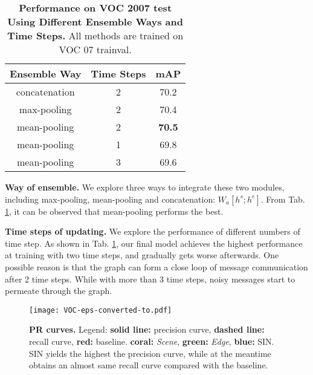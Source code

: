 \documentclass[10pt,twocolumn,letterpaper]{article}
\begin{document}
{\begin{table}
\caption{{\bf Performance on VOC 2007 test Using Different Ensemble Ways and Time Steps.} All methods are trained on VOC 07 trainval.}
\begin{center}
{
\begin{tabular}{c|c|c}
\hline
Ensemble Way & Time Steps & mAP \\
\hline
\hline
concatenation & 2 & 70.2 \\
max-pooling & 2 & 70.4 \\
\hline
mean-pooling & 2 & {\bf 70.5} \\
\hline
mean-pooling & 1  & 69.8 \\
mean-pooling & 3 & 69.6 \\
\hline
\end{tabular}}
\end{center}
\label{table:ensemble}
\vspace{-5ex}
\end{table}


{\bf Way of ensemble.}
We explore three ways to integrate these two modules, including max-pooling, mean-pooling and concatenation: $W_a[h^s; h^e]$. From Tab. \ref{table:ensemble}, it can be observed that mean-pooling performs the best.

{\bf Time steps of updating.}
We explore the performance of different numbers of time step. As shown in Tab. \ref{table:ensemble}, our final model achieves the highest performance at training with two time steps, and gradually gets worse afterwards. One possible reason is that
{the graph can form a close loop of message communication after 2 time steps. While with more than 3 time steps, noisy messages start to permeate through the graph.}


\begin{figure}[t]
\vspace{-0.5ex}
\centering
 \texttt{[image: VOC-eps-converted-to.pdf]}
    \caption{{\bf PR curves.} Legend: {\bf solid line:} precision curve, {\bf dashed line:} recall curve, {\bf red:} baseline. {\bf coral:} {\em Scene}, {\bf green:} {\em Edge}, {\bf blue:} SIN. SIN yields the highest the precision curve, while at the meantime obtains an almost same recall curve compared with the baseline.}
\label{fig:PR}
\vspace{-3ex}
\end{figure}

}
\end{document}
